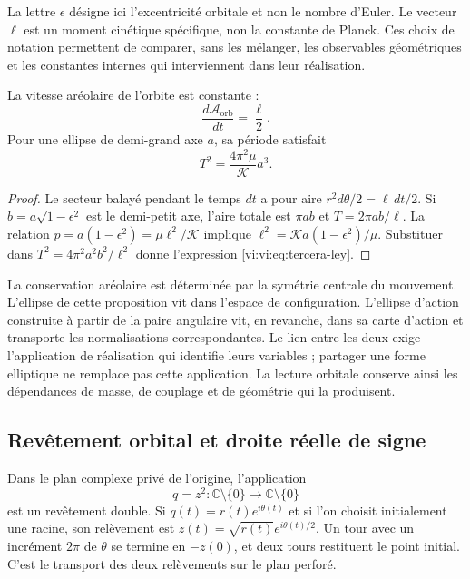 La lettre $\epsilon$ désigne ici l’excentricité orbitale et
non le nombre d’Euler. Le vecteur $\boldsymbol\ell$ est un
moment cinétique spécifique, non la constante de Planck.
Ces choix de notation permettent de comparer, sans les mélanger,
les observables géométriques et les constantes internes qui
interviennent dans leur réalisation.

\begin{proposition}
\label{vi:vi:prop:ley-areal}
La vitesse aréolaire de l’orbite est constante :
\begin{equation}
 \frac{d\mathcal A_{\mathrm{orb}}}{dt}=\frac\ell2.
 \label{vi:vi:eq:ley-areal}
\end{equation}
Pour une ellipse de demi-grand axe $a$, sa période satisfait
\begin{equation}
 T^2=\frac{4\pi^2\mu}{\mathcal K}a^3.
 \label{vi:vi:eq:tercera-ley}
\end{equation}
\end{proposition}
\begin{proof}
Le secteur balayé pendant le temps $dt$ a pour aire
$r^2d\theta/2=\ell\,dt/2$. Si $b=a\sqrt{1-\epsilon^2}$
est le demi-petit axe, l’aire totale est $\pi ab$ et
$T=2\pi ab/\ell$. La relation
$p=a(1-\epsilon^2)=\mu\ell^2/\mathcal K$ implique
$\ell^2=\mathcal K a(1-\epsilon^2)/\mu$.
Substituer dans $T^2=4\pi^2a^2b^2/\ell^2$ donne l’expression
\eqref{vi:vi:eq:tercera-ley}.
\end{proof}

La conservation aréolaire est déterminée par la symétrie centrale
du mouvement. L'ellipse de cette proposition vit dans
l'espace de configuration. L'ellipse d'action construite
à partir de la paire angulaire vit, en revanche, dans sa carte d'action
et transporte les normalisations correspondantes. Le lien
entre les deux exige l'application de réalisation qui identifie leurs
variables ; partager une forme elliptique ne remplace pas cette application.
La lecture orbitale conserve ainsi les dépendances de masse,
de couplage et de géométrie qui la produisent.

\subsection{Revêtement orbital et droite réelle de signe}
\label{vi:vi:subsec:cubierta-orbital}

Dans le plan complexe privé de l’origine, l’application
\begin{equation}
 q=z^2:\mathbb C\setminus\{0\}\longrightarrow
                 \mathbb C\setminus\{0\}
 \label{vi:vi:eq:levi-civita}
\end{equation}
est un revêtement double. Si $q(t)=r(t)e^{i\theta(t)}$ et si l’on
choisit initialement une racine, son relèvement est
$z(t)=\sqrt{r(t)}e^{i\theta(t)/2}$. Un tour avec un incrément
$2\pi$ de $\theta$ se termine en $-z(0)$, et deux tours
restituent le point initial. C’est le transport des deux
relèvements sur le plan perforé.


